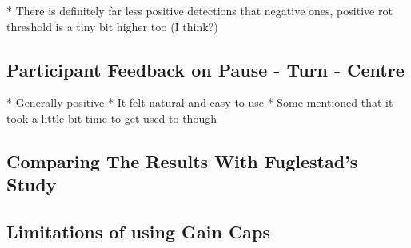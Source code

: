 * There is definitely far less positive detections that negative ones, positive rot threshold is a tiny bit higher too (I think?)

\subsection{Participant Feedback on Pause - Turn - Centre}
* Generally positive
* It felt natural and easy to use
* Some mentioned that it took a little bit time to get used to though

\subsection{Comparing The Results With Fuglestad's Study}

\subsection{Limitations of using Gain Caps}